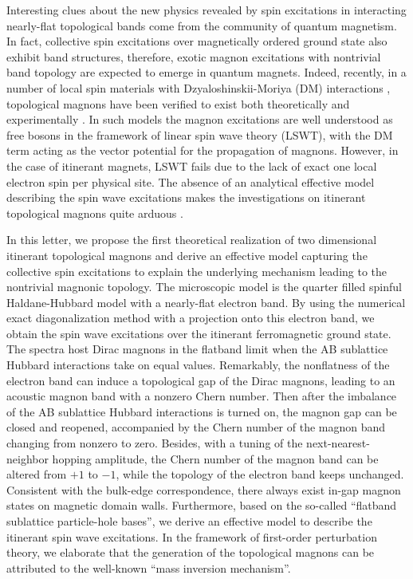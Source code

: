 \documentclass[amsmath,superscriptaddress,showpacs,aps,prl,twocolumn]{revtex4-1}
\begin{document}
\par Interesting clues about the new physics revealed by spin excitations in interacting nearly-flat topological bands come from the community of quantum magnetism. In fact, collective spin excitations over magnetically ordered ground state also exhibit band structures, therefore, exotic magnon excitations with nontrivial band topology are expected to emerge in quantum magnets. Indeed, recently, in a number of local spin materials with Dzyaloshinskii-Moriya (DM) interactions \cite{Dzyaloshinsky_JPCS1958,Moriya_PR1960}, topological magnons have been verified to exist both theoretically \cite{Zhang_PRB2013,Owerre_JPCM2016,Li_NC2016,Mook_PRL2016,Laurell_PRL2017} and experimentally \cite{Onose_S2010,Chisnell_PRL2015,Yao_NP2018,Bao_NC2018}. In such models the magnon excitations are well understood as free bosons in the framework of linear spin wave theory (LSWT), with the DM term acting as the vector potential for the propagation of magnons. However, in the case of itinerant magnets, LSWT fails due to the lack of exact one local electron spin per physical site. The absence of an analytical effective model describing the spin wave excitations makes the investigations on itinerant topological magnons quite arduous \cite{Su_PRB2018}.

\par In this letter, we propose the first theoretical realization of two dimensional itinerant topological magnons and derive an effective model capturing the collective spin excitations to explain the underlying mechanism leading to the nontrivial magnonic topology. The microscopic model is the quarter filled spinful Haldane-Hubbard model with a nearly-flat electron band. By using the numerical exact diagonalization method with a projection onto this electron band, we obtain the spin wave excitations over the itinerant ferromagnetic ground state. The spectra host Dirac magnons in the flatband limit when the AB sublattice Hubbard interactions take on equal values. Remarkably, the nonflatness of the electron band can induce a topological gap of the Dirac magnons, leading to an acoustic magnon band with a nonzero Chern number. Then after the imbalance of the AB sublattice Hubbard interactions is turned on, the magnon gap can be closed and reopened, accompanied by the Chern number of the magnon band changing from nonzero to zero. Besides, with a tuning of the next-nearest-neighbor hopping amplitude, the Chern number of the magnon band can be altered from $+1$ to $-1$, while the topology of the electron band keeps unchanged. Consistent with the bulk-edge correspondence, there always exist in-gap magnon states on magnetic domain walls. Furthermore, based on the so-called ``flatband sublattice particle-hole bases'', we derive an effective model to describe the itinerant spin wave excitations. In the framework of first-order perturbation theory, we elaborate that the generation of the topological magnons can be attributed to the well-known ``mass inversion mechanism''.
\end{document}
